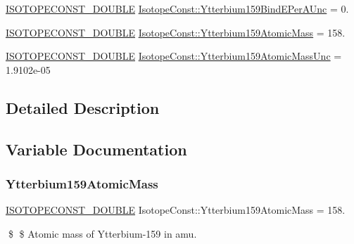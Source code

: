 \begin{DoxyCompactItemize}
\mbox{\hyperlink{group___isotope_const-_macros_ga8f45a7272ce02c0b4c65c44636ed719a}{I\+S\+O\+T\+O\+P\+E\+C\+O\+N\+S\+T\+\_\+\+D\+O\+U\+B\+LE}} \mbox{\hyperlink{group___isotope_const-_ytterbium-_yb159_ga7341bc9ab6a9bcb14ac6cb78f070ca91}{Isotope\+Const\+::\+Ytterbium159\+Bind\+E\+Per\+A\+Unc}} = 0.
\item 
\mbox{\hyperlink{group___isotope_const-_macros_ga8f45a7272ce02c0b4c65c44636ed719a}{I\+S\+O\+T\+O\+P\+E\+C\+O\+N\+S\+T\+\_\+\+D\+O\+U\+B\+LE}} \mbox{\hyperlink{group___isotope_const-_ytterbium-_yb159_ga8954565331b877463a2c3e5b59f86111}{Isotope\+Const\+::\+Ytterbium159\+Atomic\+Mass}} = 158.
\item 
\mbox{\hyperlink{group___isotope_const-_macros_ga8f45a7272ce02c0b4c65c44636ed719a}{I\+S\+O\+T\+O\+P\+E\+C\+O\+N\+S\+T\+\_\+\+D\+O\+U\+B\+LE}} \mbox{\hyperlink{group___isotope_const-_ytterbium-_yb159_gacc9c6ce26fa066a276c7e021697973ea}{Isotope\+Const\+::\+Ytterbium159\+Atomic\+Mass\+Unc}} = 1.\+9102e-\/05
\end{DoxyCompactItemize}


\subsection{Detailed Description}


\subsection{Variable Documentation}
\mbox{\label{group___isotope_const-_ytterbium-_yb159_ga8954565331b877463a2c3e5b59f86111}} 
\subsubsection{\texorpdfstring{Ytterbium159\+Atomic\+Mass}{Ytterbium159AtomicMass}}
{\footnotesize\ttfamily \mbox{\hyperlink{group___isotope_const-_macros_ga8f45a7272ce02c0b4c65c44636ed719a}{I\+S\+O\+T\+O\+P\+E\+C\+O\+N\+S\+T\+\_\+\+D\+O\+U\+B\+LE}} Isotope\+Const\+::\+Ytterbium159\+Atomic\+Mass = 158.}

\$ \$ Atomic mass of Ytterbium-\/159 in amu. \mbox{\label{group___isotope_const-_ytterbium-_yb159_gacc9c6ce26fa066a276c7e021697973ea}} 
